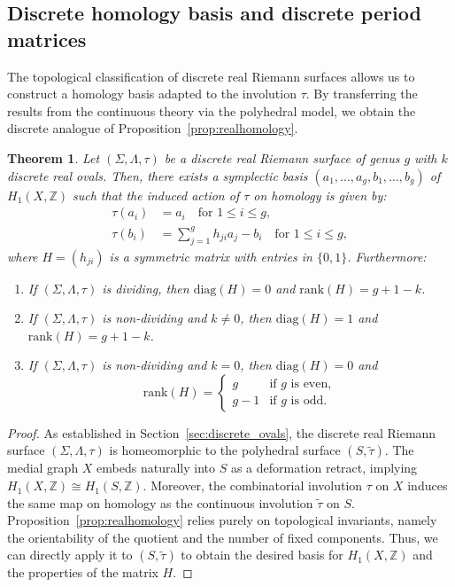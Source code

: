 \documentclass[11pt,a4paper]{article}
\newtheorem{theorem}{Theorem}[section]
\theoremstyle{definition}
\newcommand{\Z}{\mathds{Z}}
\begin{document}
\subsection{Discrete homology basis and discrete period matrices}\label{sec:discrete_homology}

The topological classification of discrete real Riemann surfaces allows us to construct a homology basis adapted to the involution $\tau$. By transferring the results from the continuous theory via the polyhedral model, we obtain the discrete analogue of Proposition~\ref{prop:realhomology}.

\begin{theorem}\label{th:realhomology_discrete}
	Let $(\Sigma, \Lambda, \tau)$ be a discrete real Riemann surface of genus $g$ with $k$ discrete real ovals. Then, there exists a symplectic basis $(a_1, \ldots, a_g, b_1, \ldots, b_g)$ of $H_1(X,\Z)$ such that the induced action of $\tau$ on homology is given by:
	\begin{align*}
		\tau(a_i) &= a_i \quad \text{for } 1 \leq i \leq g,\\
		\tau(b_i) &= \sum_{j=1}^g h_{ji} a_j - b_i \quad \text{for } 1 \leq i \leq g,
	\end{align*}
	where $H = (h_{ji})$ is a symmetric matrix with entries in $\{0,1\}$. Furthermore:
	\begin{enumerate}
		\item[(i)] If $(\Sigma, \Lambda, \tau)$ is dividing, then $\mathrm{diag}(H) = 0$ and $\mathrm{rank}(H) = g + 1 - k$.
		\item[(ii)] If $(\Sigma, \Lambda, \tau)$ is non-dividing and $k \neq 0$, then $\mathrm{diag}(H) = 1$ and $\mathrm{rank}(H) = g + 1 - k$.
		\item[(iii)] If $(\Sigma, \Lambda, \tau)$ is non-dividing and $k = 0$, then $\mathrm{diag}(H) = 0$ and
		\[
		\mathrm{rank}(H) =
		\begin{cases}
			g & \text{if } g \text{ is even}, \\
			g - 1 & \text{if } g \text{ is odd}.
		\end{cases}
		\]
	\end{enumerate}
\end{theorem}

\begin{proof}
	As established in Section~\ref{sec:discrete_ovals}, the discrete real Riemann surface $(\Sigma, \Lambda, \tau)$ is homeomorphic to the polyhedral surface $(S, \tilde{\tau})$. The medial graph $X$ embeds naturally into $S$ as a deformation retract, implying $H_1(X, \Z) \cong H_1(S, \Z)$. Moreover, the combinatorial involution $\tau$ on $X$ induces the same map on homology as the continuous involution $\tilde{\tau}$ on $S$. Proposition~\ref{prop:realhomology} relies purely on topological invariants, namely the orientability of the quotient and the number of fixed components. Thus, we can directly apply it to $(S, \tilde{\tau})$ to obtain the desired basis for $H_1(X, \Z)$ and the properties of the matrix $H$.
\end{proof}
\end{document}
